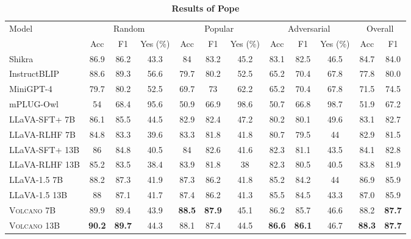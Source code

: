 \documentclass[11pt]{article}
\newcommand{\Ours}{\textsc{Volcano}}
\begin{document}
\begin{table*}[t]
\scriptsize
\centering
\begin{tabular}{lccc|ccc|ccc|cc}
\toprule
\multirow{2}{*}{Model}  & \multicolumn{3}{c|}{Random} &	\multicolumn{3}{c|}{Popular} & \multicolumn{3}{c|}{Adversarial} & \multicolumn{2}{c}{Overall}\\
& Acc  & F1  & Yes (\%) & Acc  & F1  & Yes (\%) & Acc  & F1  & Yes (\%) & Acc  & F1  \\
\midrule
Shikra & 86.9 & 86.2 & 43.3 & 84 & 83.2 & 45.2 & 83.1 & 82.5 & 46.5 & 84.7 & 84.0 \\
InstructBLIP & 88.6 & 89.3 & 56.6	& 79.7	& 80.2	& 52.5&	65.2	&70.4	&67.8	&77.8	&80.0\\
MiniGPT-4&	79.7	&80.2&	52.5	&69.7&	73	&62.2&	65.2&	70.4&	67.8&	71.5	&74.5\\
mPLUG-Owl&	54	&68.4	&95.6&	50.9	&66.9&	98.6&	50.7&	66.8	&98.7&	51.9	&67.2\\
LLaVA-SFT+ 7B&	86.1	&85.5	&44.5	&82.9&	82.4	&47.2	&80.2&	80.1&	49.6	&83.1&	82.7\\
LLaVA-RLHF 7B&	84.8&	83.3&	39.6&	83.3	&81.8&	41.8	&80.7	&79.5	&44	&82.9&	81.5 \\
LLaVA-SFT+ 13B&	86&	84.8&	40.5&	84&	82.6&	41.6&	82.3	&81.1&	43.5&	84.1&	82.8\\
LLaVA-RLHF 13B&	85.2	&83.5	&38.4&	83.9&	81.8	&38	&82.3&	80.5	&40.5&	83.8&	81.9 \\
\midrule
LLaVA-1.5 7B	&88.2	&87.3&	41.9&	87.3	&86.2	&41.8&	85.2	&84.2	&44&	86.9	&85.9 \\
LLaVA-1.5 13B&	88&	87.1	&41.7&	87.4	&86.2	&41.3	&85.5&	84.5	&43.3	&87.0	&85.9 \\
{\Ours} 7B&	89.9	&89.4	&43.9	&\textbf{88.5}&	\textbf{87.9}	&45.1	&86.2&	85.7&	46.6	&88.2&	\textbf{87.7} \\
{\Ours} 13B& \textbf{90.2}& \textbf{89.7}& 44.3& 88.1& 87.4& 44.5& \textbf{86.6}& \textbf{86.1}& 46.7& \textbf{88.3}& \textbf{87.7}\\										
\bottomrule
\end{tabular}
\caption{\textbf{Results of Pope}}
\label{tab:Table7}
\end{table*}
\end{document}
